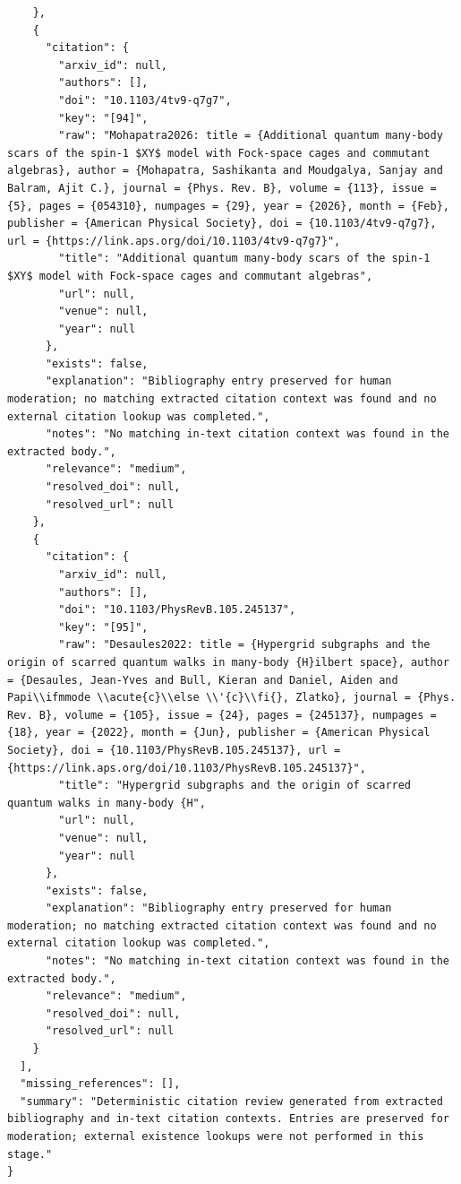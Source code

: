 \documentclass[11pt]{article}
\begin{document}
\begin{verbatim}
    },
    {
      "citation": {
        "arxiv_id": null,
        "authors": [],
        "doi": "10.1103/4tv9-q7g7",
        "key": "[94]",
        "raw": "Mohapatra2026: title = {Additional quantum many-body scars of the spin-1 $XY$ model with Fock-space cages and commutant algebras}, author = {Mohapatra, Sashikanta and Moudgalya, Sanjay and Balram, Ajit C.}, journal = {Phys. Rev. B}, volume = {113}, issue = {5}, pages = {054310}, numpages = {29}, year = {2026}, month = {Feb}, publisher = {American Physical Society}, doi = {10.1103/4tv9-q7g7}, url = {https://link.aps.org/doi/10.1103/4tv9-q7g7}",
        "title": "Additional quantum many-body scars of the spin-1 $XY$ model with Fock-space cages and commutant algebras",
        "url": null,
        "venue": null,
        "year": null
      },
      "exists": false,
      "explanation": "Bibliography entry preserved for human moderation; no matching extracted citation context was found and no external citation lookup was completed.",
      "notes": "No matching in-text citation context was found in the extracted body.",
      "relevance": "medium",
      "resolved_doi": null,
      "resolved_url": null
    },
    {
      "citation": {
        "arxiv_id": null,
        "authors": [],
        "doi": "10.1103/PhysRevB.105.245137",
        "key": "[95]",
        "raw": "Desaules2022: title = {Hypergrid subgraphs and the origin of scarred quantum walks in many-body {H}ilbert space}, author = {Desaules, Jean-Yves and Bull, Kieran and Daniel, Aiden and Papi\\ifmmode \\acute{c}\\else \\'{c}\\fi{}, Zlatko}, journal = {Phys. Rev. B}, volume = {105}, issue = {24}, pages = {245137}, numpages = {18}, year = {2022}, month = {Jun}, publisher = {American Physical Society}, doi = {10.1103/PhysRevB.105.245137}, url = {https://link.aps.org/doi/10.1103/PhysRevB.105.245137}",
        "title": "Hypergrid subgraphs and the origin of scarred quantum walks in many-body {H",
        "url": null,
        "venue": null,
        "year": null
      },
      "exists": false,
      "explanation": "Bibliography entry preserved for human moderation; no matching extracted citation context was found and no external citation lookup was completed.",
      "notes": "No matching in-text citation context was found in the extracted body.",
      "relevance": "medium",
      "resolved_doi": null,
      "resolved_url": null
    }
  ],
  "missing_references": [],
  "summary": "Deterministic citation review generated from extracted bibliography and in-text citation contexts. Entries are preserved for moderation; external existence lookups were not performed in this stage."
}
\end{verbatim}
\end{document}

